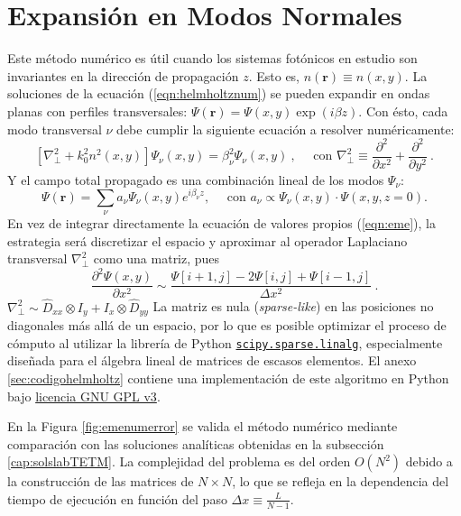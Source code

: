 \section{Expansión en Modos Normales \label{cap:eme}}
Este método numérico es útil cuando los sistemas fotónicos en estudio son invariantes en la dirección de propagación $z$. Esto es, $n(\textbf{r})\equiv n(x,y)$. La soluciones de la ecuación (\ref{eqn:helmholtznum}) se pueden expandir en ondas planas con perfiles transversales: $\Psi(\textbf{r}) = \Psi(x,y) \exp({i\beta z})$. Con ésto, cada modo transversal $\nu$ debe cumplir la siguiente ecuación a resolver numéricamente:
\begin{equation}
	\left[\nabla_\perp^2 + k_0^2 n^2(x,y)\right]\Psi_\nu(x,y) = \beta_\nu^2\Psi_\nu(x,y) \ , \quad\text{ con } \nabla_\perp^2 \equiv \frac{\partial^2}{\partial x^2} + \frac{\partial^2}{\partial y^2} \ .
	\label{eqn:eme}
\end{equation}
Y el campo total propagado es una combinación lineal de los modos $\Psi_\nu$: 
\begin{equation}
	\Psi(\textbf{r}) = \sum_\nu a_\nu \Psi_\nu(x,y) e^{i\beta_\nu z}, \quad\text{ con } a_\nu \propto \Psi_\nu(x,y) \cdot \Psi(x, y, z=0). \label{eqn:emedin}
\end{equation}
En vez de integrar directamente la ecuación de valores propios (\ref{eqn:eme}), la estrategia será discretizar el espacio y aproximar al operador Laplaciano transversal $\nabla_\perp^2$ como una matriz, pues $$\frac{\partial^2 \Psi(x,y)}{\partial x^2} \sim \frac{\Psi[i+1,j]-2\Psi[i,j]+\Psi[i-1,j]}{\Delta x ^2}  \ .
$$
$\nabla^2_\perp \sim \hat{D}_{xx} \otimes I_y + I_x \otimes \hat{D}_{yy}$
La matriz es nula (\textit{sparse-like}) en las posiciones no diagonales más allá de un espacio, por lo que es posible optimizar el proceso de cómputo al utilizar la librería de Python \href{https://docs.scipy.org/doc/scipy/reference/sparse.linalg.html}{\color{magenta}\texttt{scipy.sparse.linalg}}, especialmente diseñada para el álgebra lineal de matrices de escasos elementos. El anexo \ref{sec:codigohelmholtz} contiene una implementación de este algoritmo en Python bajo \href{https://www.gnu.org/licenses/gpl-3.0.html}{\color{magenta}licencia GNU GPL v3}.

En la Figura \ref{fig:emenumerror} se valida el método numérico mediante comparación con las soluciones analíticas obtenidas en la subsección \ref{cap:solslabTETM}. La complejidad del problema es del orden $O(N^2)$ debido a la construcción de las matrices de $N\times N$, lo que se refleja en la dependencia del tiempo de ejecución en función del paso $\Delta x \equiv \frac{L}{N-1}$.


